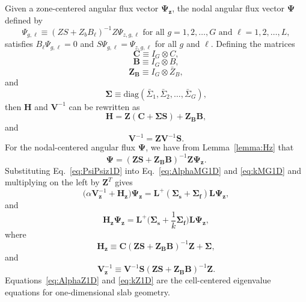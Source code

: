 Given a zone-centered angular flux vector $\mathbf{\Psi_{z}}$, the nodal angular flux vector $\mathbf{\Psi}$ defined by
\begin{equation}
	\Psi_{g,\ell} \equiv (ZS + Z_{b}B_{\ell})^{-1}Z \Psi_{z,g,\ell} \text{ for all } g = 1, 2, \dots, G \text{ and } \ell = 1, 2, \dots, L,
\end{equation}
satisfies $B_{\ell} \Psi_{g,\ell} = 0$ and $S \Psi_{g,\ell} = \Psi_{z,g,\ell}$ for all $g$ and $\ell$. Defining the matrices
\begin{equation}
	\mathbf{C} \equiv I_{G} \otimes C,
\end{equation}
\begin{equation}
	\mathbf{B} \equiv I_{G} \otimes B,
\end{equation}
\begin{equation}
	\mathbf{Z_{B}} \equiv I_{G} \otimes \bar{Z}_{B},
\end{equation}
and
\begin{equation}
	\mathbf{\Sigma} \equiv \text{diag}(\bar{\Sigma}_{1}, \bar{\Sigma}_{2}, \dots, \bar{\Sigma}_{G}),
\end{equation}
then $\mathbf{H}$ and $\mathbf{V}^{-1}$ can be rewritten as
\begin{equation}
	\mathbf{H} = \mathbf{Z}(\mathbf{C} + \mathbf{\Sigma S}) + \mathbf{Z_{B} B},
\end{equation}
and
\begin{equation}
	\mathbf{V}^{-1} = \mathbf{Z}\mathbf{V}^{-1} \mathbf{S}.
\end{equation}
For the nodal-centered angular flux $\mathbf{\Psi}$, we have from Lemma~\ref{lemma:Hz} that
\begin{equation}
	\mathbf{\Psi} = (\mathbf{ZS} + \mathbf{Z_{B}B})^{-1}\mathbf{Z}\mathbf{\Psi_{z}}.
	\label{eq:PsiPsiz1D}
\end{equation}
Substituting Eq.~\ref{eq:PsiPsiz1D} into Eq.~\ref{eq:AlphaMG1D} and \ref{eq:kMG1D} and multiplying on the left by $\mathbf{Z}^{T}$ gives
\begin{equation}
	\big ( \alpha \mathbf{V}_\mathbf{z}^{-1} + \mathbf{H_{z}} \big ) \mathbf{\Psi_{z}} = \mathbf{L}^{+}( \mathbf{\Sigma_{s}} + \mathbf{\Sigma_{f}}) \mathbf{L} \mathbf{\Psi_{z}},
	\label{eq:AlphaZ1D}
\end{equation}
and
\begin{equation}
	\mathbf{H_{z}} \mathbf{\Psi_{z}} = \mathbf{L}^{+} \bigg ( \mathbf{\Sigma_{s}} + \frac{1}{k}\mathbf{\Sigma_{f}} \bigg ) \mathbf{L} \mathbf{\Psi_{z}},
	\label{eq:kZ1D}
\end{equation}
where
\begin{equation}
	\mathbf{H_{z}} \equiv \mathbf{C}(\mathbf{ZS} + \mathbf{Z_{B}B})^{-1}\mathbf{Z} + \mathbf{\Sigma},
\end{equation}
and
\begin{equation}
	\mathbf{V}_{\mathbf{z}}^{-1} \equiv \mathbf{V}^{-1} \mathbf{S} (\mathbf{ZS} + \mathbf{Z_{B}B})^{-1}\mathbf{Z}.
\end{equation}
Equations~\ref{eq:AlphaZ1D} and \ref{eq:kZ1D} are the cell-centered eigenvalue equations for one-dimensional slab geometry.